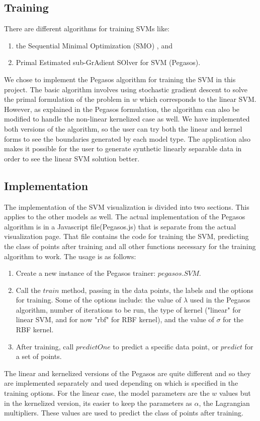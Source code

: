 \documentclass[11pt,letterpaper]{article}
\begin{document}
\subsection{Training}
There are different algorithms for training SVMs like:
\begin{enumerate}
\item
the Sequential Minimal Optimization (SMO) \cite{Platt}, and
\item
Primal Estimated sub-GrAdient SOlver for SVM (Pegasos).
\end{enumerate} 

We chose to implement the Pegasos algorithm for training the SVM in this project. The basic algorithm involves using stochastic gradient descent to solve the primal formulation of the problem in $w$ which corresponds to the linear SVM. However, as explained  in the Pegasos formulation\cite{Shalev-Shwartz}, the algorithm can also be modified to handle the non-linear kernelized case as well. We have implemented both versions of the algorithm, so the user can try both the linear and kernel forms to see the boundaries generated by each model type. The application also makes it possible for the user to generate synthetic linearly separable data in order to see the linear SVM solution better. 

\subsection{Implementation}
The implementation of the SVM visualization is divided into two sections. This applies to the other models as well. The actual implementation of the Pegasos algorithm is in a Javascript file(Pegasos.js) that is separate from the actual visualization page. That file contains the code for training the SVM, predicting the class of points after training and all other functions necessary for the training algorithm to work. The usage is as follows:
\begin{enumerate}[i]
\item
Create a new instance of the Pegasos trainer: $pegasos.SVM$.
\item
Call the $train$ method, passing in the data points, the labels and the options for training. Some of the options include: the value of $\lambda$ used in the Pegasos algorithm, number of iterations to be run, the type of kernel ("linear" for linear SVM, and for now "rbf" for RBF kernel), and the value of $\sigma$ for the RBF kernel.
\item
After training, call $predictOne$ to predict a specific data point, or $predict$ for a set of points.
\end{enumerate}
The linear and kernelized versions of the Pegasos are quite different and so they are implemented separately and used depending on which is specified in the training options. For the linear case, the model parameters are the $w$ values but in the kernelized version, its easier to keep the parameters as $\alpha$, the Lagrangian multipliers. These values are used to predict the class of points after training.
\end{document}
